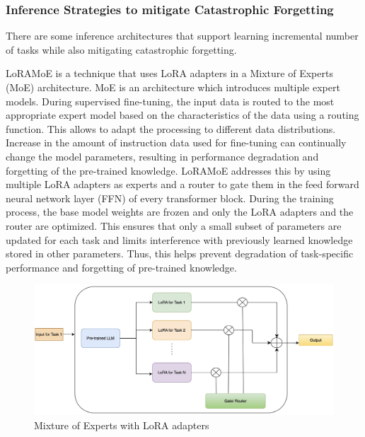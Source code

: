 \subsubsection{Inference Strategies to mitigate Catastrophic Forgetting}
There are some inference architectures that support learning incremental number of tasks while also mitigating catastrophic forgetting.

LoRAMoE \cite{dou2023loramoe} is a technique that uses LoRA adapters in a Mixture of Experts (MoE) architecture. MoE is an architecture which introduces multiple expert models. During supervised fine-tuning, the input data is routed to the most appropriate expert model based on the characteristics of the data using a routing function. This allows to adapt the processing to different data distributions. Increase in the amount of instruction data used for fine-tuning can continually change the model parameters, resulting in performance degradation and forgetting of the pre-trained knowledge. LoRAMoE addresses this by using multiple LoRA adapters as experts and a router to gate them in the feed forward neural network layer (FFN) of every transformer block. During the training process, the base model weights are frozen and only the LoRA adapters and the router are optimized. This ensures that only a small subset of parameters are updated for each task and limits interference with previously learned knowledge stored in other parameters. Thus, this helps prevent degradation of task-specific performance and forgetting of pre-trained knowledge. 
\begin{figure}[h]
    \centering
    \includegraphics[width=1\textwidth]{Figures/literature_review/mixture_of_experts.jpeg} 
    \caption{Mixture of Experts with LoRA adapters}
    \label{fig:LoRAMoE}
\end{figure}

